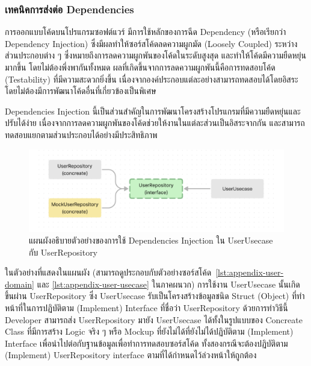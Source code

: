 \documentclass[12pt,one side,openright,a4paper]{cpe-thesis-th}
\newcommand{\thaijustify}[1]{%
  \par\hspace{30pt}\justifying
  #1
}
\begin{document}
        \subsubsection{เทคนิคการส่งต่อ Dependencies}
            \thaijustify{
                การออกแบบโค้ดบนโปรแกรมซอฟต์แวร์ มีการใช้หลักของการฉีด Dependency (หรือเรียกว่า Dependency Injection) ซึ่งมีผลทำให้ซอร์สโค้ดลดความผูกมัด (Loosely Coupled) ระหว่างส่วนประกอบต่าง ๆ ซึ่งหมายถึงการลดความผูกพันของโค้ดในระดับสูงสุด และทำให้โค้ดมีความยืดหยุ่นมากขึ้น โดยไม่ต้องพึ่งพากันทั้งหมด ผลที่เกิดขึ้นจากการลดความผูกพันนี้คือการทดสอบโค้ด (Testability) ที่มีความสะดวกยิ่งขึ้น เนื่องจากองค์ประกอบแต่ละอย่างสามารถทดสอบได้โดยอิสระ โดยไม่ต้องมีการพัฒนาโค้ดอื่นที่เกี่ยวข้องเป็นพิเศษ
            }
            \thaijustify{
                Dependencies Injection นี้เป็นส่วนสำคัญในการพัฒนาโครงสร้างโปรแกรมที่มีความยืดหยุ่นและปรับได้ง่าย เนื่องจากการลดความผูกพันของโค้ดช่วยให้งานในแต่ละส่วนเป็นอิสระจากกัน และสามารถทดสอบแยกตามส่วนประกอบได้อย่างมีประสิทธิภาพ
            }
            \begin{figure}[H]
                \centering
                \includegraphics[width=12cm]{figure/results/deps-inject.png}
                \caption[แผนผังอธิบายตัวอย่างของการใช้ Dependencies Injection]{แผนผังอธิบายตัวอย่างของการใช้ Dependencies Injection ใน UserUsecase กับ UserRepository}
                \label{fig:res-deps-inject}
            \end{figure}
            \thaijustify{
                ในตัวอย่างที่แสดงในแผนผัง (สามารถดูประกอบกับตัวอย่างซอร์สโค้ด~\ref{lst:appendix-user-domain} และ \ref{lst:appendix-user-usecase} ในภาคผนวก) การใช้งาน UserUsecase นั้นเกิดขึ้นผ่าน UserRepository ซึ่ง UserUsecase รับเป็นโครงสร้างข้อมูลชนิด Struct (Object) ที่ทำหน้าที่ในการปฏิบัติตาม (Implement) Interface ที่ชื่อว่า UserRepository ด้วยการทำวิธีนี้ Developer สามารถส่ง UserRepository มายัง UserUsecase ได้ทั้งในรูปแบบของ Concreate Class ที่มีการสร้าง Logic จริง ๆ หรือ Mockup ที่ยังไม่ได้ที่ยังไม่ได้ปฏิบัติตาม (Implement) Interface เพื่อนำไปต่อกับฐานข้อมูลเพื่อทำการทดสอบซอร์สโค้ด ทั้งสองกรณีจะต้องปฏิบัติตาม (Implement) UserRepository interface ตามที่ได้กำหนดไว้ล่วงหน้าให้ถูกต้อง
            }
\end{document}
